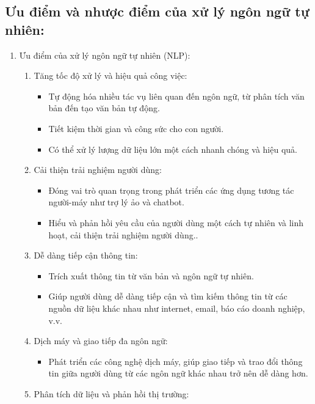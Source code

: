 \subsection{Ưu điểm và nhược điểm của xử lý ngôn ngữ tự nhiên:}

\begin{enumerate}
    \item Ưu điểm của xử lý ngôn ngữ tự nhiên (NLP):
    \begin{enumerate}
        \item Tăng tốc độ xử lý và hiệu quả công việc:
        \begin{itemize}
            \item Tự động hóa nhiều tác vụ liên quan đến ngôn ngữ, từ phân tích văn bản đến tạo văn bản tự động.
            \item Tiết kiệm thời gian và công sức cho con người.
            \item Có thể xử lý lượng dữ liệu lớn một cách nhanh chóng và hiệu quả.
        \end{itemize}
        \item Cải thiện trải nghiệm người dùng:
        \begin{itemize}
            \item Đóng vai trò quan trọng trong phát triển các ứng dụng tương tác người-máy như trợ lý ảo và chatbot.
            \item Hiểu và phản hồi yêu cầu của người dùng một cách tự nhiên và linh hoạt, cải thiện trải nghiệm người dùng..
        \end{itemize}
        \item Dễ dàng tiếp cận thông tin:
        \begin{itemize}
            \item Trích xuất thông tin từ văn bản và ngôn ngữ tự nhiên.
            \item Giúp người dùng dễ dàng tiếp cận và tìm kiếm thông tin từ các nguồn dữ liệu khác nhau như internet, email, báo cáo doanh nghiệp, v.v.
        \end{itemize}
        \item Dịch máy và giao tiếp đa ngôn ngữ:
        \begin{itemize}
            \item Phát triển các công nghệ dịch máy, giúp giao tiếp và trao đổi thông tin giữa người dùng từ các ngôn ngữ khác nhau trở nên dễ dàng hơn.
        \end{itemize}
        \item Phân tích dữ liệu và phản hồi thị trường:

\end{enumerate}
\end{enumerate}
